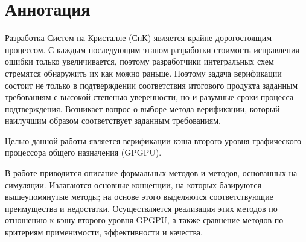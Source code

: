\section*{Аннотация}

\tab Разработка Систем-на-Кристалле (СнК) является крайне дорогостоящим процессом. С каждым последующим этапом разработки стоимость исправления ошибки только увеличивается, поэтому разработчики интегральных схем стремятся обнаружить их как можно раньше. Поэтому задача верификации состоит не только в подтверждении соответствия итогового продукта заданным требованиям с высокой степенью уверенности, но и разумные сроки процесса подтверждения. Возникает вопрос о выборе метода верификации, который наилучшим образом соответствует заданным требованиям.

Целью данной работы является верификации кэша второго уровня графического процессора общего назначения (GPGPU). 

В работе приводится описание формальных методов и методов, основанных на симуляции. Излагаются основные концепции, на которых базируются вышеупомянутые методы; на основе этого выделяются соответствующие преимущества и недостатки. Осуществляется реализация этих методов по отношению к кэшу второго уровня GPGPU, а также сравнение методов по критериям применимости, эффективности и качества.

